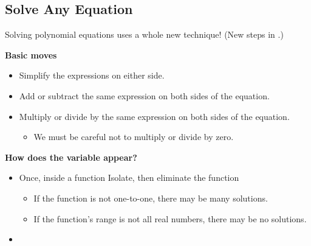 \subsection{Solve Any Equation} 
Solving polynomial equations uses a whole new technique! (New steps in .)
\begin{fact}
\textbf{Basic moves}
\begin{itemize}
\item Simplify the expressions on either side.
\item Add or subtract the same expression on both sides of the equation.
\item Multiply or divide by the same expression on both sides of the equation.
\begin{itemize}
\item We must be careful not to multiply or divide by zero.
\end{itemize}
\end{itemize}
\textbf{How does the variable appear?}
\begin{itemize}
\item Once, inside a function {\textrightarrow} Isolate, then eliminate the function
\begin{itemize}
\item If the function is not one-to-one, there may be many solutions.
\item If the function's range is not all real numbers, there may be no solutions.
\end{itemize}
\item{}
\end{itemize}
\end{fact}
